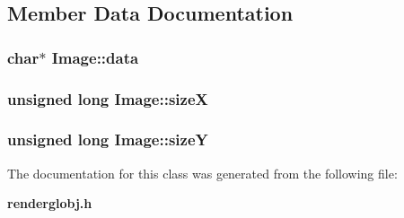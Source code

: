 \subsection{Member Data Documentation}
\subsubsection{\setlength{\rightskip}{0pt plus 5cm}char$\ast$ Image::data}\label{class_Image_m2}


\subsubsection{\setlength{\rightskip}{0pt plus 5cm}unsigned long Image::size\-X}\label{class_Image_m0}


\subsubsection{\setlength{\rightskip}{0pt plus 5cm}unsigned long Image::size\-Y}\label{class_Image_m1}




The documentation for this class was generated from the following file:\begin{CompactItemize}
\item 
{\bf renderglobj.h}\end{CompactItemize}
